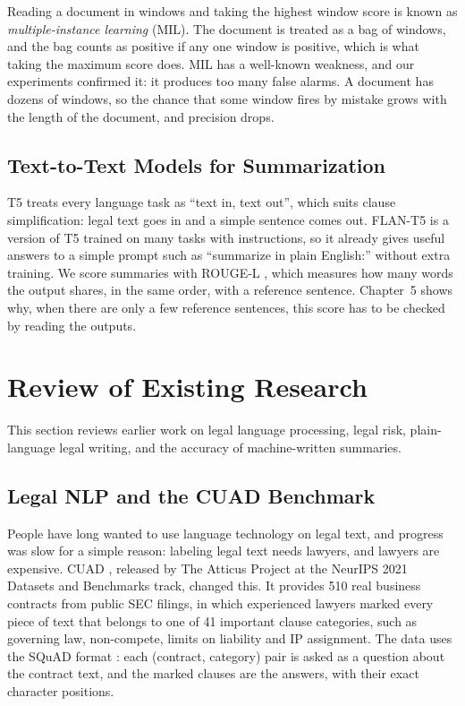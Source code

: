 Reading a document in windows and taking the highest window score is known as \emph{multiple-instance learning} (MIL). The document is treated as a bag of windows, and the bag counts as positive if any one window is positive, which is what taking the maximum score does. MIL has a well-known weakness, and our experiments confirmed it: it produces too many false alarms. A document has dozens of windows, so the chance that some window fires by mistake grows with the length of the document, and precision drops.
\subsection{Text-to-Text Models for Summarization}
T5 \cite{raffel2020t5} treats every language task as ``text in, text out'', which suits clause simplification: legal text goes in and a simple sentence comes out. FLAN-T5 \cite{chung2022flan} is a version of T5 trained on many tasks with instructions, so it already gives useful answers to a simple prompt such as ``summarize in plain English:'' without extra training. We score summaries with ROUGE-L \cite{lin2004rouge}, which measures how many words the output shares, in the same order, with a reference sentence. Chapter~5 shows why, when there are only a few reference sentences, this score has to be checked by reading the outputs.

\section{Review of Existing Research}
This section reviews earlier work on legal language processing, legal risk, plain-language legal writing, and the accuracy of machine-written summaries.

\subsection{Legal NLP and the CUAD Benchmark}
People have long wanted to use language technology on legal text, and progress was slow for a simple reason: labeling legal text needs lawyers, and lawyers are expensive. CUAD \cite{hendrycks2021cuad}, released by The Atticus Project \cite{atticus2021} at the NeurIPS 2021 Datasets and Benchmarks track, changed this. It provides 510 real business contracts from public SEC filings, in which experienced lawyers marked every piece of text that belongs to one of 41 important clause categories, such as governing law, non-compete, limits on liability and IP assignment. The data uses the SQuAD format \cite{rajpurkar2016squad}: each (contract, category) pair is asked as a question about the contract text, and the marked clauses are the answers, with their exact character positions.

